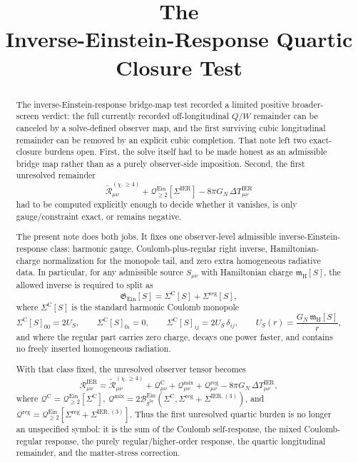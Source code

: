 \documentclass[11pt]{article}
\title{\textbf{The \TheoryName{}}\\[0.4em]
\large Inverse-Einstein-Response Quartic Closure Test}
\author{}
\date{}
\newcommand{\ReBridge}{g^{\mathrm{br}}}
\newcommand{\SigmaIER}{\Sigma^{\mathrm{IER}}}
\newcommand{\SigmaLongThree}{\Sigma^{\mathrm{IER},(3)}}
\newcommand{\SigmaC}{\Sigma^{\mathrm{C}}}
\newcommand{\SigmaReg}{\Sigma^{\mathrm{reg}}}
\newcommand{\ReLongFour}{\widetilde{\mathcal R}_{\mu\nu}^{(\chi,\ge 4)}}
\newcommand{\DeltaTIER}{\Delta T_{\mu\nu}^{\mathrm{IER}}}
\newcommand{\EinQuad}{\mathcal Q_{\ge 2}^{\mathrm{Ein}}}
\newcommand{\EinInv}{\mathfrak G_{\mathrm{Ein}}}
\newcommand{\EinBil}{\mathcal B_{\ReBridge}^{\mathrm{Ein}}}
\newcommand{\HamCharge}{\mathfrak m_{\mathrm H}}
\begin{document}
\maketitle

\begin{abstract}
The inverse-Einstein-response bridge-map test recorded a limited positive broader-screen verdict: the full currently recorded off-longitudinal \(Q/W\) remainder can be canceled by a solve-defined observer map, and the first surviving cubic longitudinal remainder can be removed by an explicit cubic completion. That note left two exact-closure burdens open. First, the solve itself had to be made honest as an admissible bridge map rather than as a purely observer-side imposition. Second, the first unresolved remainder
\[
\ReLongFour+\EinQuad[\SigmaIER]-8\pi G_N\,\DeltaTIER
\]
had to be computed explicitly enough to decide whether it vanishes, is only gauge/constraint exact, or remains negative.

The present note does both jobs. It fixes one observer-level admissible inverse-Einstein-response class: harmonic gauge, Coulomb-plus-regular right inverse, Hamiltonian-charge normalization for the monopole tail, and zero extra homogeneous radiative data. In particular, for any admissible source \(S_{\mu\nu}\) with Hamiltonian charge \(\HamCharge[S]\), the allowed inverse is required to split as
\[
\EinInv[S]=\SigmaC[S]+\SigmaReg[S],
\]
where \(\SigmaC[S]\) is the standard harmonic Coulomb monopole
\[
\SigmaC[S]_{00}=2U_S,\qquad
\SigmaC[S]_{0i}=0,\qquad
\SigmaC[S]_{ij}=2U_S\,\delta_{ij},
\qquad
U_S(r)=\frac{G_N\,\HamCharge[S]}{r},
\]
and where the regular part carries zero charge, decays one power faster, and contains no freely inserted homogeneous radiation.

With that class fixed, the unresolved observer tensor becomes
\[
\mathcal R_{\mu\nu}^{\mathrm{IER}}
=
\ReLongFour
+\mathcal Q_{\mu\nu}^{\mathrm C}
+\mathcal Q_{\mu\nu}^{\mathrm{mix}}
+\mathcal Q_{\mu\nu}^{\mathrm{reg}}
-8\pi G_N\,\DeltaTIER,
\]
where \(\mathcal Q^{\mathrm C}=\EinQuad[\SigmaC]\), \(\mathcal Q^{\mathrm{mix}}=2\EinBil(\SigmaC,\SigmaReg+\SigmaLongThree)\), and \(\mathcal Q^{\mathrm{reg}}=\EinQuad[\SigmaReg+\SigmaLongThree]\). Thus the first unresolved quartic burden is no longer an unspecified symbol: it is the sum of the Coulomb self-response, the mixed Coulomb-regular response, the purely regular/higher-order response, the quartic longitudinal remainder, and the matter-stress correction.


\end{abstract}
\end{document}
